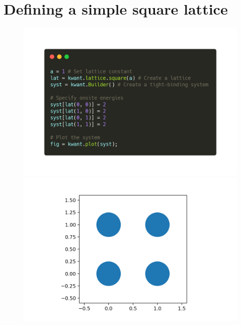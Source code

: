 \documentclass[12pt]{article}
\numberwithin{equation}{section}
\begin{document}
\section*{Defining a simple square lattice}
\begin{figure}[h!]
  \centering
  \begin{minipage}{0.49\textwidth}
    \centering
    \includegraphics[width=1.0\textwidth]{./media/example-1-code.png} %
\end{minipage}\hfill
  \begin{minipage}{0.49\textwidth}
      \centering
      \includegraphics[width=1.0\textwidth]{./media/example-1.png} %
  \end{minipage}
\end{figure}
\end{document}
